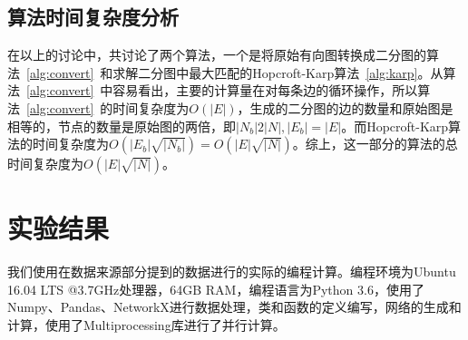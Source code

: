 \subsection{算法时间复杂度分析}
在以上的讨论中，共讨论了两个算法，一个是将原始有向图转换成二分图的算法~\ref{alg:convert}~和求解二分图中最大匹配的Hopcroft-Karp算法~\ref{alg:karp}。从算法~\ref{alg:convert}~中容易看出，主要的计算量在对每条边的循环操作，所以算法~\ref{alg:convert}~的时间复杂度为$O(|E|)$，生成的二分图的边的数量和原始图是相等的，节点的数量是原始图的两倍，即$|N_b| 2 |N|, |E_b| = |E|$。而Hopcroft-Karp算法的时间复杂度为$O(|E_b|\sqrt{|N_b|}) = O(|E|\sqrt{|N|})$。综上，这一部分的算法的总时间复杂度为$O(|E|\sqrt{|N|})$。


\section{实验结果}
我们使用在数据来源部分提到的数据进行的实际的编程计算。编程环境为Ubuntu 16.04 LTS @3.7GHz处理器，64GB RAM，编程语言为Python 3.6，使用了Numpy、Pandas、NetworkX进行数据处理，类和函数的定义编写，网络的生成和计算，使用了Multiprocessing库进行了并行计算。
